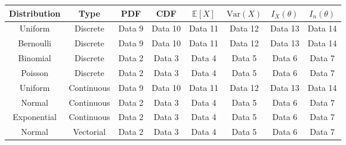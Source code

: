 \documentclass{article}
\begin{document}
\begin{table}[h]
    \centering
    \begin{tabular}{ c c c c c c c c } %
        Distribution & Type & PDF & CDF & $\mathbb{E}[X]$ & $\mathrm{Var}(X)$ & $I_X(\theta)$ & $I_n(\theta)$ \\
        \toprule
        Uniform  & Discrete  & Data 9   & Data 10  & Data 11  & Data 12  & Data 13  & Data 14  \\
        \midrule
        Bernoulli & Discrete  & Data 9   & Data 10  & Data 11  & Data 12  & Data 13  & Data 14  \\
        \midrule
        Binomial & Discrete  & Data 2   & Data 3   & Data 4   & Data 5   & Data 6   & Data 7   \\
        \midrule
        Poisson & Discrete  & Data 2   & Data 3   & Data 4   & Data 5   & Data 6   & Data 7   \\
        \midrule
        Uniform  & Continuous  & Data 9   & Data 10  & Data 11  & Data 12  & Data 13  & Data 14  \\
        \midrule
        Normal  & Continuous  & Data 2   & Data 3   & Data 4   & Data 5   & Data 6   & Data 7   \\
        \midrule
        Exponential  & Continuous  & Data 2   & Data 3   & Data 4   & Data 5   & Data 6   & Data 7   \\
        \midrule
        Normal  & Vectorial  & Data 2   & Data 3   & Data 4   & Data 5   & Data 6   & Data 7   \\
        \bottomrule
    \end{tabular}
\end{table}
\end{document}
